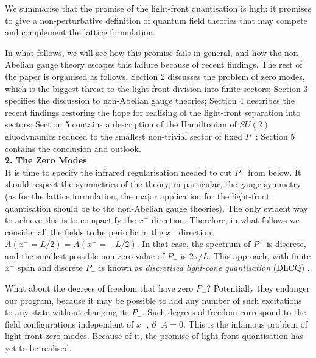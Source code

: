 \documentclass[a4paper,12pt]{article}
\begin{document}
We summarise  that the promise of the light-front quantisation 
is high: it promises 
to give a non-perturbative 
definition of quantum field theories 
that may compete and complement the lattice formulation.

In what follows, we will see how this promise fails in general, and how the 
non-Abelian gauge theory escapes this failure 
because of recent findings.
The rest of the paper is organised as follows. 
Section 2 discusses the problem of zero modes, 
which is the biggest threat to the light-front division into finite sectors; 
Section 3 specifies the discussion to non-Abelian gauge theories; 
Section 4 describes the 
recent findings restoring the hope for
realising of the light-front separation into sectors; 
Section 5 contains a description of the Hamiltonian 
of $SU(2)$ gluodynamics reduced to the smallest 
non-trivial sector of fixed $P_-$; 
Section 5 contains the conclusion and outlook.\\

{\bf  2. The Zero Modes }\\

It is time to specify the infrared regularisation needed 
to cut $P_-$ from below. It 
should respect the symmetries of the theory, in particular, 
the gauge symmetry
(as for the lattice formulation, the major application for 
the light-front quantisation 
should be to the non-Abelian gauge theories). The only evident 
way to achieve this 
is to compactify the $x^-$ direction. Therefore, in what follows we consider 
all the fields to be periodic in the $x^-$ direction: 
$A(x^- = L/2) = A(x^- = - L/2)$.
In that case, the spectrum of $P_-$ is discrete, and the smallest 
possible non-zero value of $P_-$ is $2\pi/L$. This approach, 
with finite $x^-$ span and discrete
$P_-$ is known as {\it discretised light-cone quantisation} (DLCQ) 
\cite{Pauli,Maskawa}.

What about the degrees of freedom that have zero $P_-$? Potentially they 
endanger our program, because it may be possible to add any number of such 
excitations to any state without changing its $P_-$. Such degrees of freedom 
correspond to the field configurations independent of $x^-$, $\partial_-A = 0$. 
This is the infamous problem of light-front zero modes. Because of it, the promise 
of light-front quantisation has yet to be realised.
\end{document}
